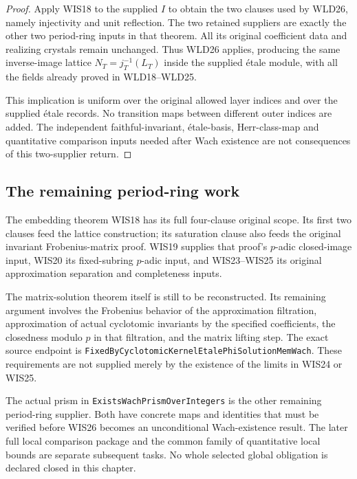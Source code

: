 \begin{proof}
Apply WIS18 to the supplied $I$ to obtain the two
clauses used by WLD26, namely injectivity and unit
reflection. The two retained suppliers are exactly
the other two period-ring inputs in that theorem.
All its original coefficient data and realizing
crystals remain unchanged. Thus WLD26 applies,
producing the same inverse-image lattice
$N_T=j_T^{-1}(L_T)$ inside the supplied
\'etale module, with all the fields already
proved in WLD18--WLD25.

This implication is uniform over the original
allowed layer indices and over the supplied
\'etale records. No transition maps between
different outer indices are added. The independent
faithful-invariant, \'etale-basis, Herr-class-map
and quantitative comparison inputs needed after
Wach existence are not consequences of this
two-supplier return.
\end{proof}

\subsection{The remaining period-ring work}

The embedding theorem WIS18 has its full four-clause original
scope. Its first two clauses feed the lattice construction;
its saturation clause also feeds the original invariant
Frobenius-matrix proof. WIS19 supplies that proof's
$p$-adic closed-image input, WIS20 its fixed-subring
$p$-adic input, and WIS23--WIS25 its original approximation
separation and completeness inputs.

The matrix-solution theorem itself is still to be reconstructed.
Its remaining argument involves the Frobenius behavior of the
approximation filtration, approximation of actual cyclotomic
invariants by the specified coefficients, the closedness
modulo $p$ in that filtration, and the matrix lifting step.
The exact source endpoint is
\texttt{FixedByCyclotomicKernelEtalePhiSolutionMemWach}.
These requirements are not supplied merely by the existence
of the limits in WIS24 or WIS25.

The actual prism in
\texttt{ExistsWachPrismOverIntegers} is the other remaining
period-ring supplier. Both have concrete maps and identities
that must be verified before WIS26 becomes an unconditional
Wach-existence result. The later full local comparison package
and the common family of quantitative local bounds are
separate subsequent tasks. No whole selected global obligation
is declared closed in this chapter.


